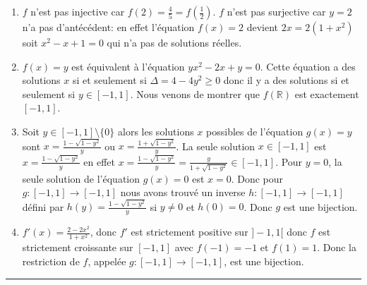 \documentclass[11pt,a4paper]{article}
\newcommand{\Rr}{\mathbb{R}} \newcommand{\R}{\mathbb{R}}
\newcommand{\fincorrection}{\vspace{1mm}\hrule\vspace*{7mm}}
\begin{document}
\begin{enumerate}
  \item $f$ n'est pas injective car $f(2) = \frac 45 = f(\frac12)$.
  $f$ n'est pas surjective car $y=2$ n'a pas d'ant\'ec\'edent: en effet 
  l'\'equation $f(x)=2$ devient $2x=2(1+x^2)$ soit $x^2-x+1=0$ qui n'a pas de solutions r\'eelles.
  \item $f(x)=y$ est \'equivalent \`a l'\'equation 
  $yx^2-2x+y=0$. Cette \'equation a des solutions $x$ si et seulement si
  $\Delta = 4-4y^2 \geq 0$ donc il y a des solutions si et seulement si $y\in[-1,1]$. Nous venons de montrer que $f(\Rr)$ est exactement $[-1,1]$.
  \item Soit $y\in[-1,1]\setminus\{0\}$ alors les solutions $x$ possibles de l'\'equation $g(x)=y$ sont $x=\frac{1-\sqrt{1-y^2}}{y}$ ou
  $x=\frac{1+\sqrt{1-y^2}}{y}$. La seule solution $x\in[-1,1]$ est
  $x=\frac{1-\sqrt{1-y^2}}{y}$ en effet
  $x=\frac{1-\sqrt{1-y^2}}{y}=\frac{y}{1+\sqrt{1-y^2}} \in[-1,1]$.
  Pour $y=0$, la seule solution de l'\'equation $g(x)=0$ est $x=0$.
  Donc pour $g : [-1,1] \longrightarrow [-1,1]$ nous avons trouv\'e un inverse $h : [-1,1] \longrightarrow [-1,1]$ d\'efini par
  $h(y) = \frac{1-\sqrt{1-y^2}}{y}$ si $y\neq0$ et $h(0)=0$. Donc $g$ est une bijection.
  \item $f'(x) = \frac{2-2x^2}{1+x^2}$, donc $f'$ est strictement positive sur $]-1,1[$ donc $f$ est strictement croissante sur $[-1,1]$ avec $f(-1)=-1$ et $f(1)=1$. Donc la restriction
  de $f$, appelée $g : [-1,1] \longrightarrow [-1,1]$, est une bijection.
\end{enumerate}
\fincorrection
\end{document}
